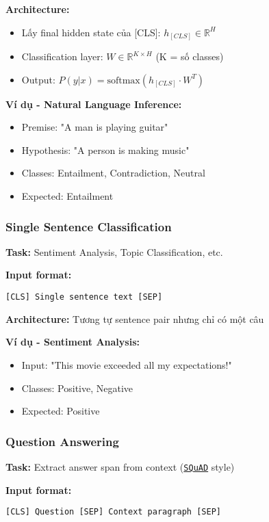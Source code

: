 \textbf{Architecture:}
\begin{itemize}
    \item Lấy final hidden state của [CLS]: $h_{[CLS]} \in \mathbb{R}^H$
    \item Classification layer: $W \in \mathbb{R}^{K
    \times H}$ (K = số classes)
    \item Output: $P(y|x) = \text{softmax}(h_{[CLS]} \cdot W^T)$
\end{itemize}

\textbf{Ví dụ - Natural Language Inference:}
\begin{itemize}
    \item Premise: "A man is playing guitar"
    \item Hypothesis: "A person is making music"
    \item Classes: Entailment, Contradiction, Neutral
    \item Expected: Entailment
\end{itemize}

\subsubsection{Single Sentence Classification}  
\textbf{Task:} Sentiment Analysis, Topic Classification, etc.

\textbf{Input format:}
\begin{verbatim}
[CLS] Single sentence text [SEP]
\end{verbatim}

\textbf{Architecture:} Tương tự sentence pair nhưng chỉ có một câu

\textbf{Ví dụ - Sentiment Analysis:}
\begin{itemize}
    \item Input: "This movie exceeded all my expectations!"
    \item Classes: Positive, Negative
    \item Expected: Positive
\end{itemize}

\subsubsection{Question Answering}
\textbf{Task:} Extract answer span from context (\hyperref[acro:squad]{\texttt{SQuAD}} style)

\textbf{Input format:}
\begin{verbatim}
[CLS] Question [SEP] Context paragraph [SEP]
\end{verbatim}

